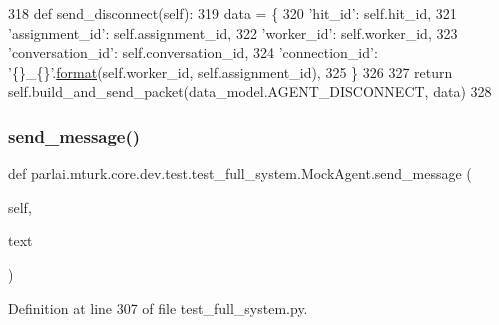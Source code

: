 \begin{DoxyCode}
318     \textcolor{keyword}{def }send\_disconnect(self):
319         data = \{
320             \textcolor{stringliteral}{'hit\_id'}: self.hit\_id,
321             \textcolor{stringliteral}{'assignment\_id'}: self.assignment\_id,
322             \textcolor{stringliteral}{'worker\_id'}: self.worker\_id,
323             \textcolor{stringliteral}{'conversation\_id'}: self.conversation\_id,
324             \textcolor{stringliteral}{'connection\_id'}: \textcolor{stringliteral}{'\{\}\_\{\}'}.\hyperlink{namespaceparlai_1_1chat__service_1_1services_1_1messenger_1_1shared__utils_a32e2e2022b824fbaf80c747160b52a76}{format}(self.worker\_id, self.assignment\_id),
325         \}
326 
327         \textcolor{keywordflow}{return} self.build\_and\_send\_packet(data\_model.AGENT\_DISCONNECT, data)
328 
\end{DoxyCode}
\mbox{\label{classparlai_1_1mturk_1_1core_1_1dev_1_1test_1_1test__full__system_1_1MockAgent_ad083e4d20ea195735ab6694723a65ebd}} 
\subsubsection{\texorpdfstring{send\+\_\+message()}{send\_message()}}
{\footnotesize\ttfamily def parlai.\+mturk.\+core.\+dev.\+test.\+test\+\_\+full\+\_\+system.\+Mock\+Agent.\+send\+\_\+message (\begin{DoxyParamCaption}\item[{}]{self,  }\item[{}]{text }\end{DoxyParamCaption})}



Definition at line 307 of file test\+\_\+full\+\_\+system.\+py.


